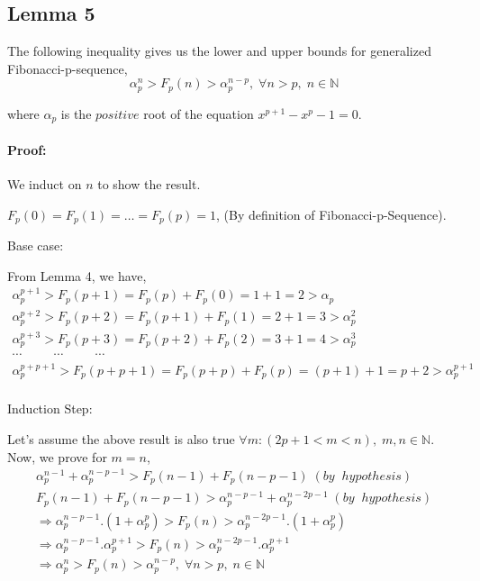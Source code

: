 \documentclass{ijcsa}
\begin{document}
\subsection{Lemma 5}
\label{sec:Lemma5}
\par The following inequality gives us the lower and upper bounds for generalized Fibonacci-p-sequence,
\begin{equation}
\alpha_{p}^{n}>F_{p}(n)>\alpha_{p}^{n-p},\;\forall{n}>p,\;n \in \mathbb{N}
\label{fibpBound}
\end{equation}
\par where $\alpha_{p}$ is the $positive$ root of the equation $x^{p+1}-x^{p}-1=0$.
\paragraph{Proof:} 
\label{sec:Proof_5}
\par We induct on $n$ to show the result. \\
\par $F_{p}(0)=F_{p}(1)=\ldots=F_{p}(p)=1$, (By definition of Fibonacci-p-Sequence). \\
\par Base case: 
\par From Lemma 4, we have, 
\begin{eqnarray*}
\alpha_{p}^{p+1}>F_{p}(p+1)=F_{p}(p)+F_{p}(0)=1+1=2>\alpha_{p} \\
\alpha_{p}^{p+2}>F_{p}(p+2)=F_{p}(p+1)+F_{p}(1)=2+1=3>\alpha_{p}^{2} \\
\alpha_{p}^{p+3}>F_{p}(p+3)=F_{p}(p+2)+F_{p}(2)=3+1=4>\alpha_{p}^{3} \\
\cdots \;\;\;\;\;\;\;\;\; \cdots \;\;\;\;\;\;\;\;\; \cdots \;\;\;\;\;\;\;\;\; \\
\alpha_{p}^{p+p+1}>F_{p}(p+p+1)=F_{p}(p+p)+F_{p}(p)=(p+1)+1=p+2>\alpha_{p}^{p+1} \\
\label{fibpprf_1}
\end{eqnarray*}
\par Induction Step:
\par Let's assume the above result is also true $\forall{m}: (2p+1<m<n),\;m,n\in \mathbb{N}$. Now, we prove for $m=n$,
\begin{eqnarray*}
\alpha_{p}^{n-1}+\alpha_{p}^{n-p-1}>F_{p}(n-1)+F_{p}(n-p-1) \; (by \;\;hypothesis)\\
F_{p}(n-1)+F_{p}(n-p-1)>\alpha_{p}^{n-p-1}+\alpha_{p}^{n-2p-1} \; (by \;\;hypothesis)\\
\Rightarrow \alpha_{p}^{n-p-1}.(1+\alpha_{p}^{p})>F_{p}(n)>\alpha_{p}^{n-2p-1}.(1+\alpha_{p}^{p}) \\
\Rightarrow \alpha_{p}^{n-p-1}.\alpha_{p}^{p+1}>F_{p}(n)>\alpha_{p}^{n-2p-1}.\alpha_{p}^{p+1} \\
\Rightarrow \alpha_{p}^{n}>F_{p}(n)>\alpha_{p}^{n-p},\;\forall{n}>p,\;n \in \mathbb{N}
\label{fibpprf}
\end{eqnarray*}
\end{document}
